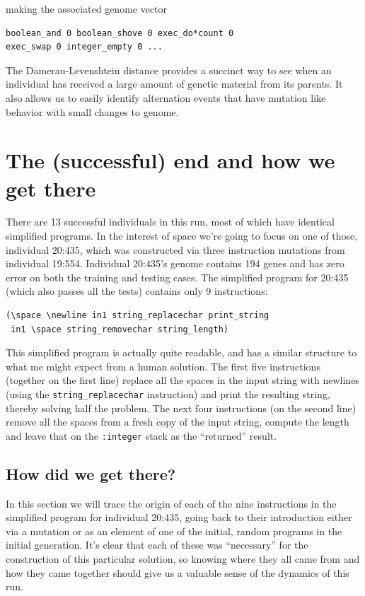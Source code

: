 making the associated genome vector

\begin{verbatim}
boolean_and 0 boolean_shove 0 exec_do*count 0 
exec_swap 0 integer_empty 0 ...
\end{verbatim}

The Damerau-Levenshtein distance provides a succinct way to see when an individual has received a
large amount of genetic material from its parents. It also allows us to easily identify alternation
events that have mutation like behavior with small changes to genome.
 
\section{The (successful) end and how we get there}
\label{sec:successfulEnd}

There are 13 successful individuals
in this run, most of which have identical simplified
programs. In the interest of space we're going to focus on one of those, 
individual 20:435, which was constructed via three instruction mutations
from individual 19:554.
Individual 20:435's genome contains 194 genes and has zero error on both
the training and testing cases.
The simplified program for 20:435 (which also passes all the tests)
contains only 9 instructions:
\begin{verbatim}
(\space \newline in1 string_replacechar print_string
 in1 \space string_removechar string_length)
\end{verbatim}
This simplified program is actually quite readable, and has a similar
structure to what me might expect from a human solution.
The first five 
instructions (together on the first line) replace all the spaces in the input string 
with newlines (using the \texttt{string\_replacechar} instruction) and print the 
resulting string, thereby solving half the problem. 
The next four instructions (on the second line) remove all the spaces from
a fresh copy of the input string, compute the length and leave that on the
\texttt{:integer} stack as the ``returned'' result.

\subsection{How did we get there?}
\label{sec:howDidWeGetThere}

In this section we will trace the origin of each of the nine instructions
in the simplified program for individual 20:435,
going back to their introduction either via a mutation or as an element 
of one of the initial, random programs in the initial generation. It's clear
that each of these was ``necessary'' for the construction of this particular
solution, so knowing where they all came from and how they came together
should give us a valuable sense of the dynamics of this run. 

